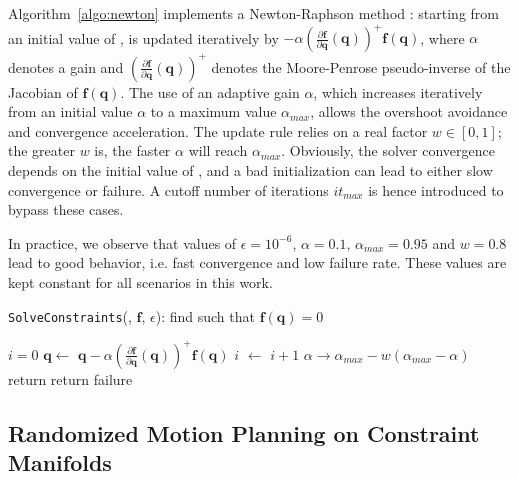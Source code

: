 Algorithm~\ref{algo:newton} implements a Newton-Raphson method
\cite{bonnans2006numerical}: starting from an initial value of
\config{}, \config{} is updated iteratively by $- \alpha
\left(\frac{\partial \mathbf{f}}{\partial
  \mathbf{q}}(\mathbf{q})\right)^{+} \mathbf{f}(\mathbf{q})$, where
$\alpha$ denotes a gain and $\left(\frac{\partial \mathbf{f}}{\partial
  \mathbf{q}}(\mathbf{q})\right)^{+}$ denotes the Moore-Penrose
pseudo-inverse of the Jacobian of $\mathbf{f}(\mathbf{q})$. The use of
an adaptive gain $\alpha$, which increases iteratively from an initial
value $\alpha$ to a maximum value $\alpha_{max}$, allows the overshoot
avoidance and convergence acceleration. The update rule relies on a
real factor $w \in [0,1]$; the greater $w$ is, the faster $\alpha$
will reach $\alpha_{max}$. Obviously, the solver convergence depends
on the initial value of \config{}, and a bad initialization can lead
to either slow convergence or failure. A cutoff number of iterations
$it_{max}$ is hence introduced to bypass these cases.

In practice, we observe that values of $\epsilon=10^{-6}$,
$\alpha=0.1$, $\alpha_{max}=0.95$ and $w=0.8$ lead to good behavior,
i.e. fast convergence and low failure rate. These values are kept
constant for all scenarios in this work.

\begin{algorithm}
\caption{\texttt{SolveConstraints}(\config{}, $\mathbf{f}$, $\epsilon$): find
  \config{} such that $\mathbf{f}(\mathbf{q}) = 0$}
\label{algo:newton}
\begin{algorithmic}
\STATE $i=0$
\STATE $\mathbf{q} \leftarrow$ $\mathbf{q} - \alpha \left(\frac{\partial \mathbf{f}}{\partial \mathbf{q}}(\mathbf{q})\right)^{+} \mathbf{f}(\mathbf{q})$
\STATE $i$ $\leftarrow$ $i+1$
\STATE $\alpha \rightarrow \alpha_{max} - w(\alpha_{max} - \alpha)$
\ENDWHILE
{}
\STATE return \config{}
\ELSE
\STATE return failure
\ENDIF
\end{algorithmic}
\end{algorithm}

\subsection{Randomized Motion Planning on Constraint Manifolds}
\label{subsec:chap2-constraint-motion-planning}

